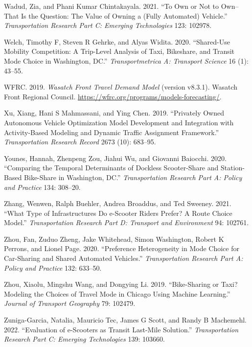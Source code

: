 \documentclass[12pt, oneside, openright]{byuthesis}
\newlength{\cslhangindent}
\newlength{\cslentryspacingunit} %
\newenvironment{CSLReferences}[2] %
 {%
  \setlength{\parindent}{0pt}
  \ifodd #1
  \let\oldpar\par
  \def\par{\hangindent=\cslhangindent\oldpar}
  \fi
  \setlength{\parskip}{#2\cslentryspacingunit}
 }%
 {}
\begin{document}
\begin{CSLReferences}{1}{0}
\leavevmode{}%
Wadud, Zia, and Phani Kumar Chintakayala. 2021. {``To Own or Not to Own--That Is the Question: The Value of Owning a (Fully Automated) Vehicle.''} \emph{Transportation Research Part C: Emerging Technologies} 123: 102978.

\leavevmode{}%
Welch, Timothy F, Steven R Gehrke, and Alyas Widita. 2020. {``Shared-Use Mobility Competition: A Trip-Level Analysis of Taxi, Bikeshare, and Transit Mode Choice in Washington, DC.''} \emph{Transportmetrica A: Transport Science} 16 (1): 43--55.

\leavevmode{}%
WFRC. 2019. \emph{Wasatch Front Travel Demand Model} (version v8.3.1). Wasatch Front Regional Council. \url{https://wfrc.org/programs/models-forecasting/}.

\leavevmode{}%
Xu, Xiang, Hani S Mahmassani, and Ying Chen. 2019. {``Privately Owned Autonomous Vehicle Optimization Model Development and Integration with Activity-Based Modeling and Dynamic Traffic Assignment Framework.''} \emph{Transportation Research Record} 2673 (10): 683--95.

\leavevmode{}%
Younes, Hannah, Zhenpeng Zou, Jiahui Wu, and Giovanni Baiocchi. 2020. {``Comparing the Temporal Determinants of Dockless Scooter-Share and Station-Based Bike-Share in Washington, DC.''} \emph{Transportation Research Part A: Policy and Practice} 134: 308--20.

\leavevmode{}%
Zhang, Wenwen, Ralph Buehler, Andrea Broaddus, and Ted Sweeney. 2021. {``What Type of Infrastructures Do e-Scooter Riders Prefer? A Route Choice Model.''} \emph{Transportation Research Part D: Transport and Environment} 94: 102761.

\leavevmode{}%
Zhou, Fan, Zuduo Zheng, Jake Whitehead, Simon Washington, Robert K Perrons, and Lionel Page. 2020. {``Preference Heterogeneity in Mode Choice for Car-Sharing and Shared Automated Vehicles.''} \emph{Transportation Research Part A: Policy and Practice} 132: 633--50.

\leavevmode{}%
Zhou, Xiaolu, Mingshu Wang, and Dongying Li. 2019. {``Bike-Sharing or Taxi? Modeling the Choices of Travel Mode in Chicago Using Machine Learning.''} \emph{Journal of Transport Geography} 79: 102479.

\leavevmode{}%
Zuniga-Garcia, Natalia, Mauricio Tec, James G Scott, and Randy B Machemehl. 2022. {``Evaluation of e-Scooters as Transit Last-Mile Solution.''} \emph{Transportation Research Part C: Emerging Technologies} 139: 103660.

\end{CSLReferences}


\end{document}
